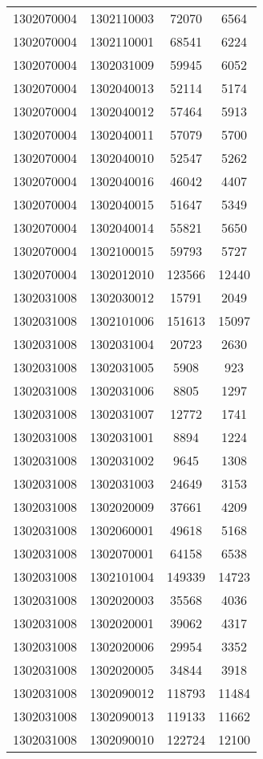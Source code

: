 \begin{longtable}[h]{llcc}
		1302070004 & 1302110003 & 72070 & 6564\\
		1302070004 & 1302110001 & 68541 & 6224\\
		1302070004 & 1302031009 & 59945 & 6052\\
		1302070004 & 1302040013 & 52114 & 5174\\
		1302070004 & 1302040012 & 57464 & 5913\\
		1302070004 & 1302040011 & 57079 & 5700\\
		1302070004 & 1302040010 & 52547 & 5262\\
		1302070004 & 1302040016 & 46042 & 4407\\
		1302070004 & 1302040015 & 51647 & 5349\\
		1302070004 & 1302040014 & 55821 & 5650\\
		1302070004 & 1302100015 & 59793 & 5727\\
		1302070004 & 1302012010 & 123566 & 12440\\
		1302031008 & 1302030012 & 15791 & 2049\\
		1302031008 & 1302101006 & 151613 & 15097\\
		1302031008 & 1302031004 & 20723 & 2630\\
		1302031008 & 1302031005 & 5908 & 923\\
		1302031008 & 1302031006 & 8805 & 1297\\
		1302031008 & 1302031007 & 12772 & 1741\\
		1302031008 & 1302031001 & 8894 & 1224\\
		1302031008 & 1302031002 & 9645 & 1308\\
		1302031008 & 1302031003 & 24649 & 3153\\
		1302031008 & 1302020009 & 37661 & 4209\\
		1302031008 & 1302060001 & 49618 & 5168\\
		1302031008 & 1302070001 & 64158 & 6538\\
		1302031008 & 1302101004 & 149339 & 14723\\
		1302031008 & 1302020003 & 35568 & 4036\\
		1302031008 & 1302020001 & 39062 & 4317\\
		1302031008 & 1302020006 & 29954 & 3352\\
		1302031008 & 1302020005 & 34844 & 3918\\
		1302031008 & 1302090012 & 118793 & 11484\\
		1302031008 & 1302090013 & 119133 & 11662\\
		1302031008 & 1302090010 & 122724 & 12100\\

\end{longtable}
